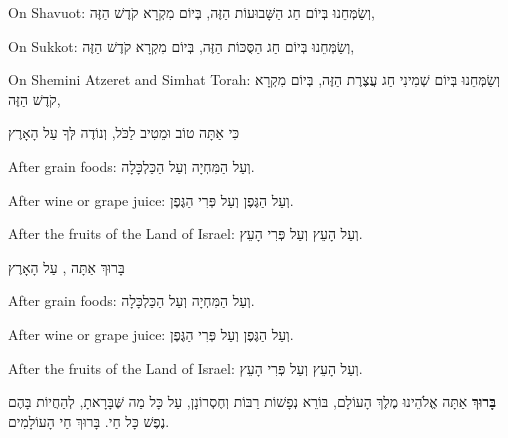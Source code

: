 \begin{seasonal}{On Shavuot:}
וְשַׂמְּחֵנוּ בְּיוֹם חַג הַשָּׁבוּעוֹת הַזֶּה, בְּיוֹם מִקְרָא קֹדֶשׁ הַזֶּה,
\end{seasonal}

\begin{seasonal}{On Sukkot:}
וְשַׂמְּחֵנוּ בְּיוֹם חַג הַסֻּכּוֹת הַזֶּה, בְּיוֹם מִקְרָא קֹדֶשׁ הַזֶּה,
\end{seasonal}

\begin{seasonal}{On Shemini Atzeret and Simhat Torah:}
וְשַׂמְּחֵנוּ בְּיוֹם שְׁמִינִי חַג עֲצֶרֶת הַזֶּה, בְּיוֹם מִקְרָא קֹדֶשׁ הַזֶּה,
\end{seasonal}

כִּי אַתָּה טוֹב וּמֵטִיב לַכֹּל, וְנוֹדֶה לְּךָ עַל הָאָרֶץ

\begin{seasonal}{After grain foods:}
וְעַל הַמִּחְיָה וְעַל הַכַּלְכָּלָה.
\end{seasonal}

\begin{seasonal}{After wine or grape juice:}
וְעַל הַגֶּפֶן וְעַל פְּרִי הַגֶּפֶן.
\end{seasonal}

\begin{seasonal}{After the fruits of the Land of Israel:}
וְעַל הָעֵץ וְעַל פְּרִי הָעֵץ.
\end{seasonal}

בָּרוּךְ אַתָּה \Shem{}, עַל הָאָרֶץ

\begin{seasonal}{After grain foods:}
וְעַל הַמִּחְיָה וְעַל הַכַּלְכָּלָה.
\end{seasonal}

\begin{seasonal}{After wine or grape juice:}
וְעַל הַגֶּפֶן וְעַל פְּרִי הַגֶּפֶן.
\end{seasonal}

\begin{seasonal}{After the fruits of the Land of Israel:}
וְעַל הָעֵץ וְעַל פְּרִי הָעֵץ.
\end{seasonal}

\divider


\textbf{בָּרוּךְ} אַתָּה \Shem{} אֱלֹהֵינוּ מֶלֶךְ הָעוֹלָם, בּוֹרֵא נְפָשׁוֹת רַבּוֹת וְחֶסְרוֹנָן, עַל
כָּל מַה שֶּׁבָּרָאתָ, לְהַחֲיוֹת בָּהֶם נֶפֶשׁ כָּל חַי. בָּרוּךְ חַי הָעוֹלָמִים.
